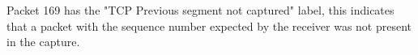 Packet 169 has the "TCP Previous segment not captured" label, this indicates that a packet with the sequence number expected by the receiver was not present in the capture. 